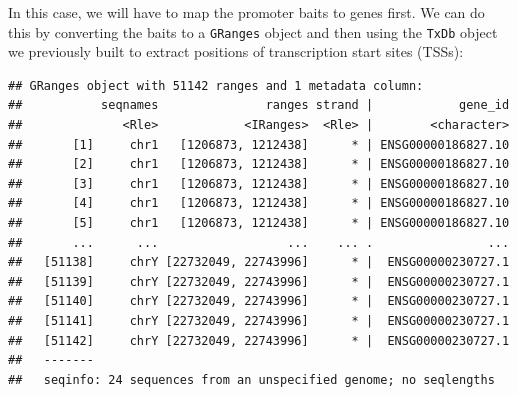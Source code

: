 \documentclass[9pt,a4paper,]{extarticle}
\newenvironment{Shaded}{\begin{snugshade}}{\end{snugshade}}
\newcommand{\KeywordTok}[1]{\textcolor[rgb]{0.13,0.29,0.53}{\textbf{#1}}}
\newcommand{\DataTypeTok}[1]{\textcolor[rgb]{0.13,0.29,0.53}{#1}}
\newcommand{\DecValTok}[1]{\textcolor[rgb]{0.00,0.00,0.81}{#1}}
\newcommand{\StringTok}[1]{\textcolor[rgb]{0.31,0.60,0.02}{#1}}
\newcommand{\OperatorTok}[1]{\textcolor[rgb]{0.81,0.36,0.00}{\textbf{#1}}}
\newcommand{\NormalTok}[1]{#1}
\begin{document}
In this case, we will have to map the promoter baits to genes first.
We can do this by converting the baits to a \texttt{GRanges} object and then using the \texttt{TxDb} object we previously built to extract positions of transcription start sites (TSSs):

\begin{Shaded}
\end{Shaded}

\begin{verbatim}
## GRanges object with 51142 ranges and 1 metadata column:
##           seqnames               ranges strand |            gene_id
##              <Rle>            <IRanges>  <Rle> |        <character>
##       [1]     chr1   [1206873, 1212438]      * | ENSG00000186827.10
##       [2]     chr1   [1206873, 1212438]      * | ENSG00000186827.10
##       [3]     chr1   [1206873, 1212438]      * | ENSG00000186827.10
##       [4]     chr1   [1206873, 1212438]      * | ENSG00000186827.10
##       [5]     chr1   [1206873, 1212438]      * | ENSG00000186827.10
##       ...      ...                  ...    ... .                ...
##   [51138]     chrY [22732049, 22743996]      * |  ENSG00000230727.1
##   [51139]     chrY [22732049, 22743996]      * |  ENSG00000230727.1
##   [51140]     chrY [22732049, 22743996]      * |  ENSG00000230727.1
##   [51141]     chrY [22732049, 22743996]      * |  ENSG00000230727.1
##   [51142]     chrY [22732049, 22743996]      * |  ENSG00000230727.1
##   -------
##   seqinfo: 24 sequences from an unspecified genome; no seqlengths
\end{verbatim}
\end{document}
